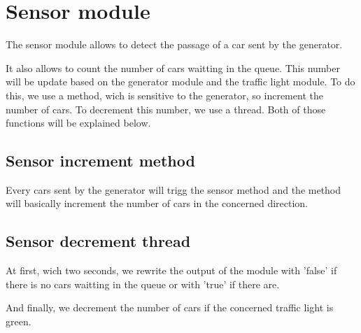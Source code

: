\section{Sensor module}

The sensor module allows to detect the passage of a car sent by the generator.

It also allows to count the number of cars waitting in the queue. This number will be update based on the generator module and the traffic light module.
To do this, we use a method, wich is sensitive to the generator, so increment the number of cars. To decrement this number, we use a thread. Both of those functions will be explained below.

\subsection{Sensor increment method}

Every cars sent by the generator will trigg the sensor method and the method will basically increment the number of cars in the concerned direction.   

\subsection{Sensor decrement thread}

At first, wich two seconds, we rewrite the output of the module with 'false' if there is no cars waitting in the queue or with 'true' if there are. 

And finally, we decrement the number of cars if the concerned traffic light is green. 
